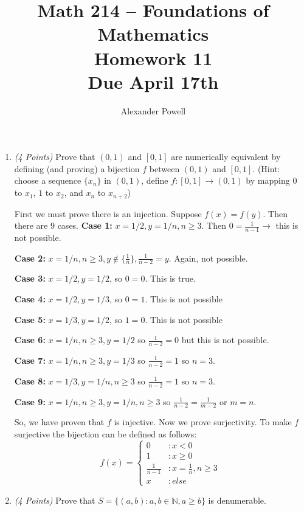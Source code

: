 \documentclass[10pt]{article} %
\title{Math 214 -- Foundations of Mathematics\\
Homework 11\\
{\large{\bf Due April 17th}}}
\date{}
\author{Alexander Powell}
\newcommand{\N}{\mathbb{N}}
\newcommand{\points}[1]{{\it (#1 Points)}}
\begin{document}
\maketitle



\begin{enumerate}

\item\points{4} Prove that $(0,1)$ and $[0,1]$ are numerically equivalent by defining (and proving) a bijection $f$ between $(0,1)$ and $[0,1]$. (Hint: choose a sequence $\{x_n\}$ in $(0,1)$, define $f:[0,1]\to (0,1)$ by mapping $0$ to $x_1$, $1$ to $x_2$, and $x_n$ to $x_{n+2}$)

 First we must prove there is an injection.  Suppose $f(x)=f(y)$.  Then there are $9$ cases.  
{\bf Case 1:} $x=1/2, y=1/n, n \geq 3$.  Then $0=\frac{1}{n-1} \rightarrow$ this is not possible. 

{\bf Case 2:} $x=1/n,n\geq3, y\not\in\{\frac{1}{n}\}, \frac{1}{n-2}=y$.  Again, not possible.  

{\bf Case 3:} $x=1/2,y=1/2$, so $0=0$.  This is true.  

{\bf Case 4:} $x=1/2,y=1/3$, so $0=1$.  This is not possible

{\bf Case 5:} $x=1/3,y=1/2$, so $1=0$.  This is not possible

{\bf Case 6:} $x=1/n, n\geq 3, y=1/2$ so $\frac{1}{n-2}=0$ but this is not possible.

{\bf Case 7:} $x=1/n, n\geq 3, y=1/3$ so $\frac{1}{n-2}=1$ so $n=3$.

{\bf Case 8:} $x=1/3,y=1/n,n\geq 3$ so $\frac{1}{n-2}=1$ so $n=3$.

{\bf Case 9:} $x=1/n,n\geq 3,y=1/n,n\geq 3$ so $\frac{1}{n-2}=\frac{1}{m-2}$ or $m=n$.  

So, we have proven that $f$ is injective.  Now we prove surjectivity.  To make $f$ surjective the bijection can be defined as follows:
\[f(x) = \left\{
  \begin{array}{lr}
    0 & : x < 0\\
    1 & : x \ge 0\\
    \frac{1}{n-1} & : x= \frac{1}{n},n\ge 3\\
    x & : else
    
  \end{array}
\right.
\]


\item\points{4} Prove that $S=\{(a, b):  a, b\in \N, a\ge b\}$ is denumerable.


\end{enumerate}
\end{document}
